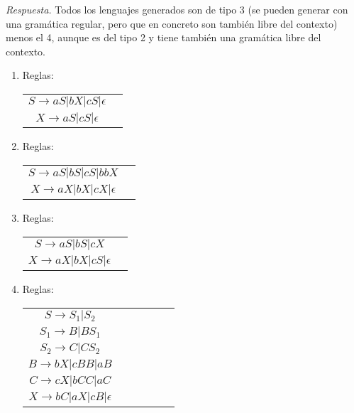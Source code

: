 \documentclass[11pt]{article}
\theoremstyle{ejercicio-style}
\begin{document}
\emph{Respuesta.} Todos los lenguajes generados son de tipo 3 (se pueden generar  con una gramática regular, pero que en concreto son también libre del contexto) menos el 4, aunque es del tipo 2 y tiene también una gramática libre del contexto.
	\begin{enumerate}
		\item Reglas:
			\begin{center}
				\begin{tabular}{cc}
					$ S \rightarrow aS | bX | cS | \epsilon $ \\
					$ X \rightarrow aS | cS | \epsilon $
				\end{tabular}
			\end{center}
		\item Reglas:
			\begin{center}
				\begin{tabular}{cc}
					$ S \rightarrow aS | bS | cS | bbX $ \\
					$ X \rightarrow aX | bX | cX | \epsilon $
				\end{tabular}
			\end{center}
		\item Reglas:
			\begin{center}
				\begin{tabular}{cc}
					$ S \rightarrow aS | bS | cX $ \\
					$ X \rightarrow aX | bX | cS | \epsilon $
				\end{tabular}
			\end{center}
		\item Reglas:
			\begin{center}
				\begin{tabular}{cccccc}
					$ S \rightarrow S_1 | S_2 $ \\
					$ S_1 \rightarrow B | BS_1 $ \\
					$ S_2 \rightarrow C | CS_2 $ \\
					$ B \rightarrow bX | cBB | aB $ \\
					$ C \rightarrow cX | bCC | aC $ \\
					$ X \rightarrow bC | aX | cB | \epsilon $
				\end{tabular}
			\end{center}
	\end{enumerate}
\end{document}
